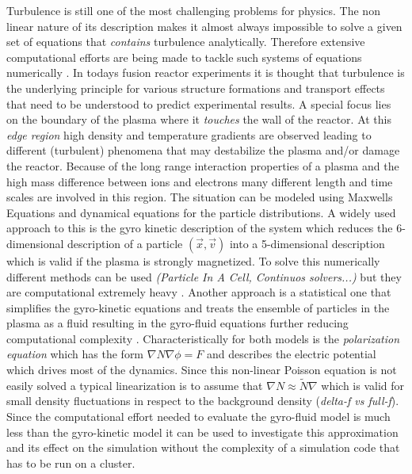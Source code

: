 \documentclass[master.tex]{subfiles}
\begin{document}
Turbulence is still one of the most challenging problems for physics. The non linear nature of its description makes it almost always impossible to solve a given set of equations that \textit{contains} turbulence analytically. Therefore extensive computational efforts are being made to tackle such systems of equations numerically \cite{IntroTurbulence}.\newline
In todays fusion reactor experiments it is thought that turbulence is the underlying principle for various structure formations and transport effects that need to be understood to predict experimental results. A special focus lies on the boundary of the plasma where it \textit{touches} the wall of the reactor. At this \textit{edge region} high density and temperature gradients are observed leading to different (turbulent) phenomena that may destabilize the plasma and/or damage the reactor.\newline
Because of the long range interaction properties of a plasma and the high mass difference between ions and electrons many different length and time scales are involved in this region.\newline
The situation can be modeled using Maxwells Equations and dynamical equations for the particle distributions. A widely used approach to this is the gyro kinetic description of the system which reduces the 6-dimensional description of a particle $(\vec{x},\vec{v})$ into a 5-dimensional description which is valid if the plasma is strongly magnetized. To solve this numerically different methods can be used \textit{(Particle In A Cell, Continuos solvers...)} but they are computational extremely heavy \cite{GyroKineticCodes}.\newline
Another approach is a statistical one that simplifies the gyro-kinetic equations and treats the ensemble of particles in the plasma as a fluid resulting in the gyro-fluid equations further reducing computational complexity \cite{HeldDisseration}.\newline
Characteristically for both models is the \textit{polarization equation} which has the form $\nabla N \nabla \phi = F$ and describes the electric potential which drives most of the dynamics. Since this non-linear Poisson equation is not easily solved a typical linearization is to assume that $\nabla N \approx \tilde{N} \nabla$ which is valid for small density fluctuations in respect to the background density (\textit{delta-f vs full-f}). Since the computational effort needed to evaluate the gyro-fluid model is much less than the gyro-kinetic model it can be used to investigate this approximation and its effect on the simulation without the complexity of a simulation code that has to be run on a cluster.\newline
\end{document}
